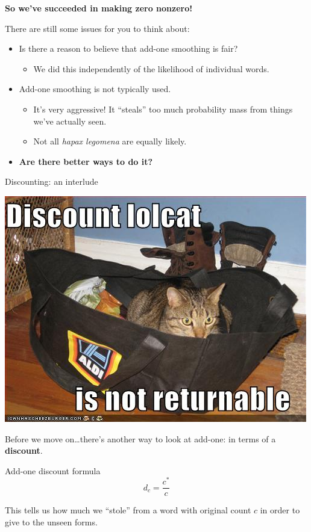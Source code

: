 \documentclass{beamer}
\newcommand{\pagestepalt}[2]{
  \begin{frame}[t]
    \begin{minipage}[t][0.26\textheight][t]{\textwidth}
      \begin{center}
        \huge
        \textbf{#1}
      \end{center}
    \end{minipage}
    
    \begin{minipage}[t][0.7\textheight][t]{\textwidth}
      #2
    \end{minipage}
  \end{frame}
}
\begin{document}
\pagestepalt{So we've succeeded in making zero nonzero!}{
  There are still some issues for you to think about: \pause
  \begin{itemize}
  \item Is there a reason to believe that add-one smoothing is fair? 
    \begin{itemize}
    \item We did this independently of the likelihood of individual words.
    \end{itemize}
  \item  Add-one smoothing is not typically used.\pause
    \begin{itemize}
    \item It's very aggressive! It ``steals'' too much probability mass from 
      things we've actually seen.\pause
    \item Not all {\it hapax legomena} are equally likely.\pause
  \end{itemize}
  \item \textbf{Are there better ways to do it?}
  \end{itemize}
}


\begin{frame}{Discounting: an interlude}
  \begin{center}
    \includegraphics[scale=0.2]{images/discount.jpg}
  \end{center}
  
  Before we move on\ldots there's another way to look at add-one: 
  in terms of a \textbf{discount}.
  \begin{block}{Add-one discount formula}
    \[d_c = \frac{c^*}{c}\]
  \end{block}
  This tells us how much we ``stole'' from a word with original count $c$
  in order to give to the unseen forms.
\end{frame}
\end{document}
